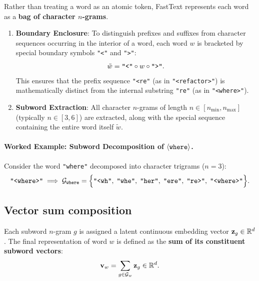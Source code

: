 \documentclass[../../main.tex]{subfiles}
\begin{document}
Rather than treating a word as an atomic token, FastText represents each word as a \textbf{bag of character $n$-grams}.

\begin{enumerate}
    \item \textbf{Boundary Enclosure}: To distinguish prefixes and suffixes from character sequences occurring in the interior of a word, each word $w$ is bracketed by special boundary symbols \texttt{"<"} and \texttt{">"}:
    \begin{equation}
    \label{eq:boundary_enclosure}
    \tilde{w} = \text{\texttt{"<"}} \circ w \circ \text{\texttt{">"}}.
    \end{equation}
    This ensures that the prefix sequence \texttt{"<re"} (as in \texttt{"<refactor>"}) is mathematically distinct from the internal substring \texttt{"re"} (as in \texttt{"<where>"}).
    
    \item \textbf{Subword Extraction}: All character $n$-grams of length $n \in [n_{\min}, n_{\max}]$ (typically $n \in [3, 6]$) are extracted, along with the special sequence containing the entire word itself $\tilde{w}$.
\end{enumerate}

\paragraph{Worked Example: Subword Decomposition of $\langle\text{\texttt{where}}\rangle$.}
Consider the word \texttt{"where"} decomposed into character trigrams ($n = 3$):
\begin{equation}
\label{eq:fasttext_subwords}
\text{\texttt{"<where>"}} \implies \mathcal{G}_{\text{\texttt{where}}} = \Big\{ \text{\texttt{"<wh"}}, \; \text{\texttt{"whe"}}, \; \text{\texttt{"her"}}, \; \text{\texttt{"ere"}}, \; \text{\texttt{"re>"}}, \; \text{\texttt{"<where>"}} \Big\}.
\end{equation}

\subsection{Vector sum composition}
\label{subsec:fasttext_composition}

Each subword $n$-gram $g$ is assigned a latent continuous embedding vector $\mathbf{z}_g \in \mathbb{R}^d$. The final representation of word $w$ is defined as the \textbf{sum of its constituent subword vectors}:
\begin{equation}
\label{eq:fasttext_sum}
\mathbf{v}_w = \sum_{g \in \mathcal{G}_w} \mathbf{z}_g \in \mathbb{R}^d.
\end{equation}
\end{document}

